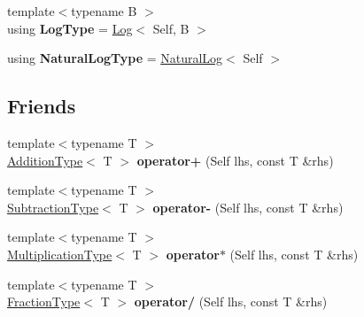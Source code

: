 \begin{DoxyCompactItemize}
\item 
\hypertarget{classlatex_1_1math_1_1Arithmetic_a4eadf0c90fdc049d2cae9666486fcbea}{{\footnotesize template$<$typename B $>$ }\\using {\bfseries Log\-Type} = \hyperlink{classlatex_1_1math_1_1Log}{Log}$<$ Self, B $>$}\label{classlatex_1_1math_1_1Arithmetic_a4eadf0c90fdc049d2cae9666486fcbea}

\item 
\hypertarget{classlatex_1_1math_1_1Arithmetic_a9915f8e5e4a9f6019e4d7e307bd52b27}{using {\bfseries Natural\-Log\-Type} = \hyperlink{classlatex_1_1math_1_1NaturalLog}{Natural\-Log}$<$ Self $>$}\label{classlatex_1_1math_1_1Arithmetic_a9915f8e5e4a9f6019e4d7e307bd52b27}

\end{DoxyCompactItemize}
\subsection*{Friends}
\begin{DoxyCompactItemize}
\item 
\hypertarget{classlatex_1_1math_1_1Arithmetic_a155d480ff9b7bc80905693bf242bb33c}{{\footnotesize template$<$typename T $>$ }\\\hyperlink{classlatex_1_1math_1_1Addition}{Addition\-Type}$<$ T $>$ {\bfseries operator+} (Self lhs, const T \&rhs)}\label{classlatex_1_1math_1_1Arithmetic_a155d480ff9b7bc80905693bf242bb33c}

\item 
\hypertarget{classlatex_1_1math_1_1Arithmetic_a24cab9ec4a616c0867cff93fc12cebb9}{{\footnotesize template$<$typename T $>$ }\\\hyperlink{classlatex_1_1math_1_1Subtraction}{Subtraction\-Type}$<$ T $>$ {\bfseries operator-\/} (Self lhs, const T \&rhs)}\label{classlatex_1_1math_1_1Arithmetic_a24cab9ec4a616c0867cff93fc12cebb9}

\item 
\hypertarget{classlatex_1_1math_1_1Arithmetic_aa267f966985c6d88035fa9303a4596e4}{{\footnotesize template$<$typename T $>$ }\\\hyperlink{classlatex_1_1math_1_1Multiplication}{Multiplication\-Type}$<$ T $>$ {\bfseries operator$\ast$} (Self lhs, const T \&rhs)}\label{classlatex_1_1math_1_1Arithmetic_aa267f966985c6d88035fa9303a4596e4}

\item 
\hypertarget{classlatex_1_1math_1_1Arithmetic_af38965342bb2cef83ee88be612d03b63}{{\footnotesize template$<$typename T $>$ }\\\hyperlink{classlatex_1_1math_1_1Fraction}{Fraction\-Type}$<$ T $>$ {\bfseries operator/} (Self lhs, const T \&rhs)}\label{classlatex_1_1math_1_1Arithmetic_af38965342bb2cef83ee88be612d03b63}

\end{DoxyCompactItemize}


